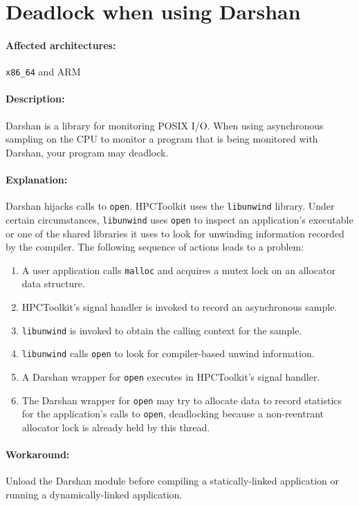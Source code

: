 \documentclass[11pt,twoside,letterpaper]{report}
\begin{document}
\section{Deadlock when using Darshan}

\paragraph{Affected architectures:}  \verb|x86_64| and ARM

\paragraph{Description:}
Darshan is a library for monitoring POSIX I/O. When using asynchronous sampling on the CPU to monitor a program that is being monitored with Darshan, your program may deadlock.

\paragraph{Explanation:} Darshan hijacks calls to \verb|open|.
HPCToolkit uses the \verb|libunwind| library.
Under certain circumstances, \verb|libunwind| uses \verb|open| to inspect an application's executable or one of the shared libraries it uses to look for unwinding information recorded by the compiler.
The following sequence of actions leads to a problem:
\begin{enumerate}
\item
A user application calls \verb|malloc| and acquires a mutex lock on an allocator data structure.
\item
HPCToolkit's signal handler is invoked to record an asynchronous sample.
\item
\verb|libunwind| is invoked to obtain the calling context for the sample.
\item
\verb|libunwind|  calls \verb|open| to look for
compiler-based unwind information.
\item
A Darshan wrapper for \verb|open| executes in HPCToolkit's signal handler.
\item
The Darshan wrapper for \verb|open| may try to allocate data to record statistics for the application's calls to \verb|open|, deadlocking because a non-reentrant allocator lock is already held by this thread.
\end{enumerate}

\paragraph{Workaround:} Unload the Darshan module before compiling a statically-linked application or running a dynamically-linked application.
\end{document}
